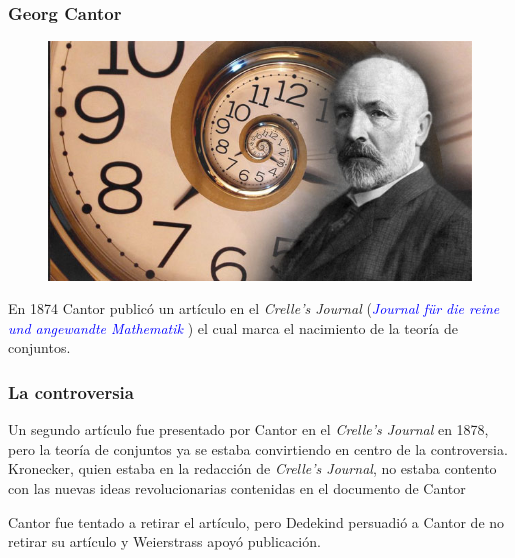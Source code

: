 \begin{frame}
\frametitle{Georg Cantor}
\begin{figure}
\includegraphics[width=1.\linewidth]{IMGS/cantor}
\end{figure}
\end{frame}

\begin{frame}

\justify
En 1874 Cantor publicó un artículo en el \textit{Crelle's Journal} ({\it \textcolor{blue}{Journal für die reine und angewandte Mathematik} }) 
el cual marca el nacimiento de la teoría de conjuntos.\\

\startchronology
[startyear=1870, stopyear=1910]
\stopchronology

\end{frame}

\begin{frame}
 \frametitle{La controversia}

\justify
Un segundo artículo fue presentado por Cantor en el \textit{Crelle's Journal} en 1878, pero la teoría de conjuntos ya se estaba convirtiendo en centro de la controversia. \\

Kronecker, quien estaba en la redacción de \textit{Crelle's Journal}, no estaba contento con las nuevas ideas revolucionarias contenidas en el documento de Cantor

\begin{block}{}
	\justify
	Cantor fue tentado a retirar el artículo, pero Dedekind persuadió a Cantor de no retirar su artículo y Weierstrass apoyó publicación.
\end{block}

\end{frame}

